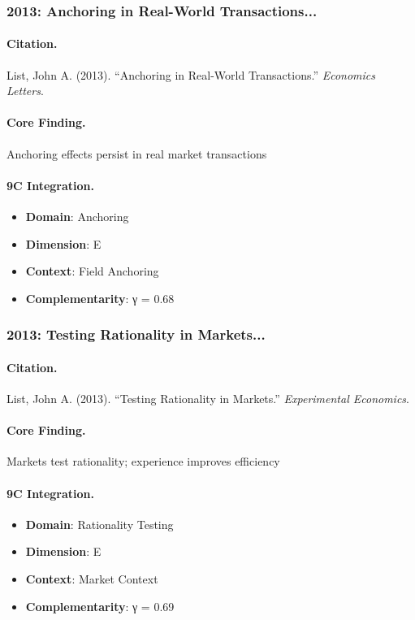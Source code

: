 \subsubsection{2013: Anchoring in Real-World Transactions...}

\paragraph{Citation.}
List, John A. (2013). ``Anchoring in Real-World Transactions.''
\textit{Economics Letters}.

\paragraph{Core Finding.}
Anchoring effects persist in real market transactions

\paragraph{9C Integration.}
\begin{itemize}[nosep]
  \item \textbf{Domain}: Anchoring
  \item \textbf{Dimension}: E
  \item \textbf{Context}: Field Anchoring
  \item \textbf{Complementarity}: γ = 0.68
\end{itemize}


\subsubsection{2013: Testing Rationality in Markets...}

\paragraph{Citation.}
List, John A. (2013). ``Testing Rationality in Markets.''
\textit{Experimental Economics}.

\paragraph{Core Finding.}
Markets test rationality; experience improves efficiency

\paragraph{9C Integration.}
\begin{itemize}[nosep]
  \item \textbf{Domain}: Rationality Testing
  \item \textbf{Dimension}: E
  \item \textbf{Context}: Market Context
  \item \textbf{Complementarity}: γ = 0.69
\end{itemize}


